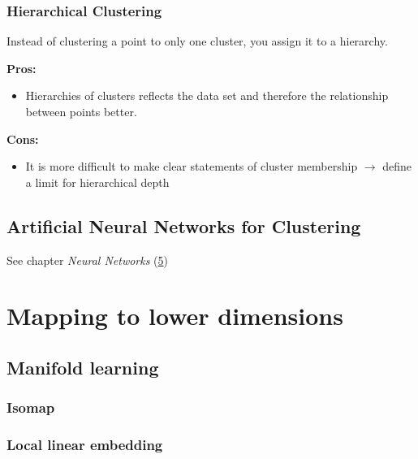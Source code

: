 \documentclass[
]{book}
\providecommand{\tightlist}{%
  \setlength{\itemsep}{0pt}\setlength{\parskip}{0pt}}
\begin{document}
\hypertarget{hierarchical-clustering}{%
\subsubsection{Hierarchical Clustering}\label{hierarchical-clustering}}

Instead of clustering a point to only one cluster, you assign it to a hierarchy.

\textbf{Pros:}

\begin{itemize}
\tightlist
\item
  Hierarchies of clusters reflects the data set and therefore the relationship between points better.
\end{itemize}

\textbf{Cons:}

\begin{itemize}
\tightlist
\item
  It is more difficult to make clear statements of cluster membership \(\rightarrow\) define a limit for hierarchical depth
\end{itemize}

\hypertarget{artificial-neural-networks-for-clustering}{%
\subsection{Artificial Neural Networks for Clustering}\label{artificial-neural-networks-for-clustering}}

See chapter \emph{Neural Networks}
(\protect\hyperlink{Neuralux5cux2520Networks}{5})

\hypertarget{mapping-to-lower-dimensions}{%
\section{Mapping to lower dimensions}\label{mapping-to-lower-dimensions}}

\hypertarget{manifold-learning}{%
\subsection{Manifold learning}\label{manifold-learning}}

\hypertarget{isomap}{%
\subsubsection{Isomap}\label{isomap}}

\hypertarget{local-linear-embedding}{%
\subsubsection{Local linear embedding}\label{local-linear-embedding}}
\end{document}
